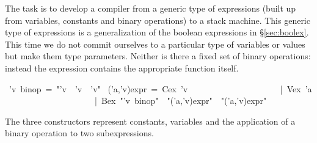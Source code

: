 \begin{isabelle}%
%
\begin{isamarkuptext}%
\noindent
The task is to develop a compiler from a generic type of expressions (built
up from variables, constants and binary operations) to a stack machine.  This
generic type of expressions is a generalization of the boolean expressions in
\S\ref{sec:boolex}.  This time we do not commit ourselves to a particular
type of variables or values but make them type parameters.  Neither is there
a fixed set of binary operations: instead the expression contains the
appropriate function itself.%
\end{isamarkuptext}%
\ 'v\ binop\ =\ {"}'v\ {\isasymRightarrow}\ 'v\ {\isasymRightarrow}\ 'v{"}\isanewline
{}\ ('a,'v)expr\ =\ Cex\ 'v\isanewline
\ \ \ \ \ \ \ \ \ \ \ \ \ \ \ \ \ \ \ \ \ |\ Vex\ 'a\isanewline
\ \ \ \ \ \ \ \ \ \ \ \ \ \ \ \ \ \ \ \ \ |\ Bex\ {"}'v\ binop{"}\ \ {"}('a,'v)expr{"}\ \ {"}('a,'v)expr{"}%
\begin{isamarkuptext}%
\noindent
The three constructors represent constants, variables and the application of
a binary operation to two subexpressions.


\end{isamarkuptext}
\end{isabelle}
